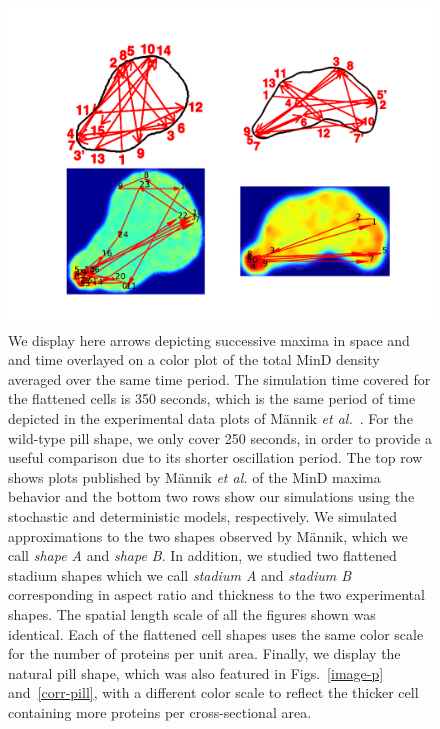 \documentclass[10pt,letterpaper]{article}
\begin{document}
\begin{figure}
  \centering
  \hspace{-3cm}
  \vspace{1cm}
  \includegraphics[width=16cm]{../paper/plot-ave}
  \caption{We display here arrows depicting successive maxima in space
    and and time overlayed on a color plot of the total MinD density
    averaged over the same time period.  The simulation time covered
    for the flattened cells is 350 seconds, which is the same
    period of time depicted in the experimental data plots of M\"annik
    \emph{et al.}~\cite{mannik2012robustness}.  For the wild-type pill
    shape, we only cover 250 seconds, in order to provide a
    useful comparison due to its shorter oscillation period.  The top
    row shows plots published by M\"annik \emph{et al.} of the MinD maxima behavior
    and the bottom two rows show our simulations using the stochastic
    and deterministic models, respectively.  We simulated
    approximations to the two shapes observed by M\"annik, which we call
    \emph{shape A} and \emph{shape B}.  In addition, we studied two
    flattened stadium shapes which we call \emph{stadium A} and
    \emph{stadium B} corresponding in aspect ratio and thickness to
    the two experimental shapes.  The spatial length scale of all the
    figures shown was identical. Each of the flattened cell shapes
    uses the same color scale for the number of proteins per unit
    area.  Finally, we display the natural pill shape, which was also
    featured in Figs.~\ref{image-p} and~\ref{corr-pill}, with a
    different color scale to reflect the thicker cell containing more
    proteins per cross-sectional area.  }
  \label{randst-plot-ave}
\end{figure}
\end{document}
